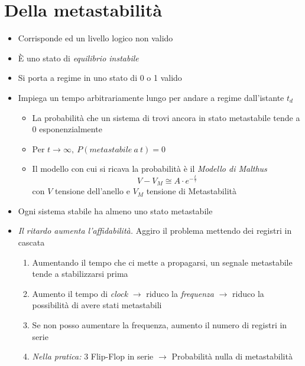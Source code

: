 \documentclass{article}
\begin{document}
\section{Della metastabilità}
\begin{itemize}
	\item Corrisponde ed un livello logico non valido
	\item \`E uno stato di \textit{equilibrio instabile}
	\item Si porta a regime in uno stato di 0 o 1 valido
	\item Impiega un tempo arbitrariamente lungo per andare a regime dall'istante \(t_d\)
	\begin{itemize}
		\item La probabilità che un sistema di trovi ancora in stato metastabile tende a \(0\) esponenzialmente
		\item Per \(t \rightarrow \infty,\ P(metastabile\:a\:t)=0 \)
		\item Il modello con cui si ricava la probabilità è il \textit{Modello di Malthus} \[V-V_M \cong A \cdot e^{-\frac{t}{\tau}}\]
		con \(V\) tensione dell'anello e \(V_M\) tensione di Metastabilità
\end{itemize}
	\item Ogni sistema stabile ha almeno uno stato metastabile
	\item \textit{Il ritardo aumenta l'affidabilità.} Aggiro il problema mettendo dei registri in cascata
	\begin{enumerate}
		\item Aumentando il tempo che ci mette a propagarsi, un segnale metastabile tende a stabilizzarsi prima
		\item Aumento il tempo di \textit{clock} \(\rightarrow\) riduco la \textit{frequenza} \(\rightarrow\) riduco la possibilità di avere stati metastabili
		\item Se non posso aumentare la frequenza, aumento il numero di registri in serie
		\item \textit{Nella pratica:} 3 Flip-Flop in serie \(\rightarrow\) Probabilità nulla di metastabilità
	\end{enumerate}
\end{itemize}
\end{document}
